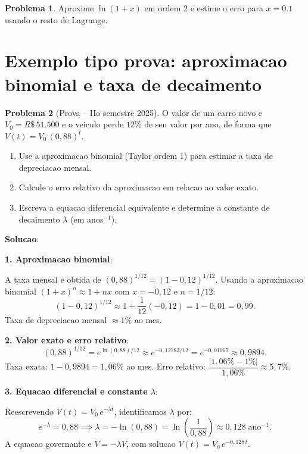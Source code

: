 \documentclass[12pt,a4paper,oneside]{book}
\theoremstyle{definition}
\newtheorem{problem}{Problema}
\begin{document}
\begin{problem}
Aproxime $\ln(1+x)$ em ordem 2 e estime o erro para $x=0.1$ usando o resto de Lagrange.
\end{problem}

\section{Exemplo tipo prova: aproximacao binomial e taxa de decaimento}

\begin{problem}[Prova -- IIo semestre 2025]
O valor de um carro novo e $V_0 = R\$\,51{.}500$ e o veiculo perde $12\%$ de seu valor
por ano, de forma que $V(t) = V_0\,(0{,}88)^t$.
\begin{enumerate}
    \item Use a aproximacao binomial (Taylor ordem 1) para estimar a taxa de
    depreciacao mensal.
    \item Calcule o erro relativo da aproximacao em relacao ao valor exato.
    \item Escreva a equacao diferencial equivalente e determine a constante de decaimento
    $\lambda$ (em anos$^{-1}$).
\end{enumerate}
\end{problem}

\textbf{Solucao}:

\textbf{1. Aproximacao binomial}:

A taxa mensal e obtida de $(0{,}88)^{1/12} = (1 - 0{,}12)^{1/12}$.
Usando a aproximacao binomial $(1+x)^n \approx 1 + nx$ com $x = -0{,}12$ e $n = 1/12$:
\begin{equation}
(1 - 0{,}12)^{1/12} \approx 1 + \frac{1}{12}(-0{,}12) = 1 - 0{,}01 = 0{,}99.
\end{equation}
Taxa de depreciacao mensal $\approx 1\%$ ao mes.

\textbf{2. Valor exato e erro relativo}:
\begin{equation}
(0{,}88)^{1/12} = e^{\ln(0{,}88)/12} \approx e^{-0{,}12783/12} = e^{-0{,}01065} \approx 0{,}9894.
\end{equation}
Taxa exata: $1 - 0{,}9894 = 1{,}06\%$ ao mes.
Erro relativo: $\dfrac{|1{,}06\% - 1\%|}{1{,}06\%} \approx 5{,}7\%$.

\textbf{3. Equacao diferencial e constante $\lambda$}:

Reescrevendo $V(t) = V_0\,e^{-\lambda t}$, identificamos $\lambda$ por:
\begin{equation}
e^{-\lambda} = 0{,}88 \implies \lambda = -\ln(0{,}88) = \ln\!\left(\frac{1}{0{,}88}\right) \approx 0{,}128\;\text{ano}^{-1}.
\end{equation}
A equacao governante e $\dot{V} = -\lambda V$, com solucao $V(t) = V_0\,e^{-0{,}128\,t}$.
\end{document}
